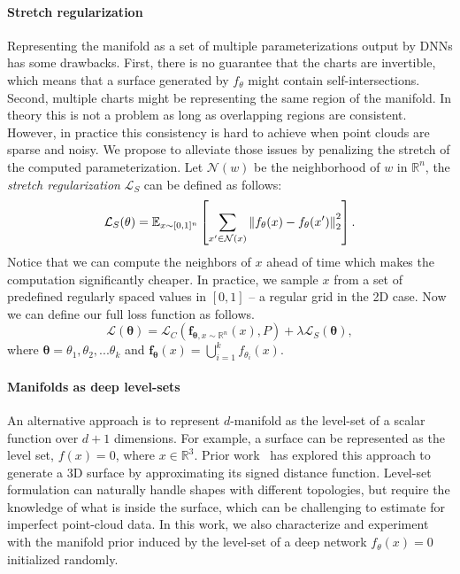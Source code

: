 \paragraph*{Stretch regularization}
Representing the manifold as a set of multiple parameterizations output by
DNNs has some drawbacks.
First, there is no guarantee that the charts are invertible, which means
that a surface generated by $f_\theta$ might contain self-intersections.
Second, multiple charts might be representing the same region of the manifold.
In theory this is not a problem as long as overlapping regions are consistent. 
However, in practice this consistency is hard to achieve when point clouds are sparse and noisy.
We propose to alleviate those issues by penalizing the stretch of the computed parameterization.
Let $\mathcal{N}(w)$ be the neighborhood of $w$ in $\mathbb{R}^n$, the \emph{stretch regularization} $\mathcal{L}_S$ can be defined as follows:
\begin{equation}
    \label{eq:stretch}
    \mathcal{L}_S(\theta) = \mathbb{E}_{x\sim [0,1]^n}
        \left[\sum_{x^\prime \in \mathcal{N}(x)} \left\lVert f_\theta(x) - f_\theta(x^\prime)\right\rVert_2^2 \right].
\end{equation}
Notice that we can compute the neighbors of $x$ ahead of time which makes
the computation significantly cheaper.
In practice, we sample $x$ from a set of predefined regularly spaced values in $[0,1]$ -- a regular grid in the 2D case.
Now we can define our full loss function as follows.
\begin{equation}
    \label{eq:objective}
    \mathcal{L}(\bm \theta) = 
    \mathcal{L}_C(\bm{f}_{\bm \theta, x \sim \mathbb{R}^n}(x), P) +
        \lambda \mathcal{L}_S(\bm \theta),
\end{equation}
where $\bm{\theta} = \theta_1, \theta_2, ... \theta_k$ and $\bm{f_\theta}(x) = \bigcup\limits_{i=1}^{k} f_{\theta_i}(x)$.

\paragraph*{Manifolds as deep level-sets} An alternative approach is to represent $d$-manifold as the level-set of a scalar function over $d+1$ dimensions.
For example, a surface can be represented as the level set, $f(x) = 0$, where $x \in \mathbb{R}^3$. 
Prior work~\cite{chen2019learning,mescheder2019occupancy,genova2019learning,park2019deepsdf} has explored this approach to generate a 3D surface by approximating its signed distance function.
Level-set formulation can naturally handle shapes with different topologies, but require the knowledge of what is inside the surface, which can be challenging to estimate for imperfect point-cloud data.
In this work, we also characterize and experiment with the manifold prior induced
by the level-set of a deep network $f_\theta(x)=0$ initialized randomly.


